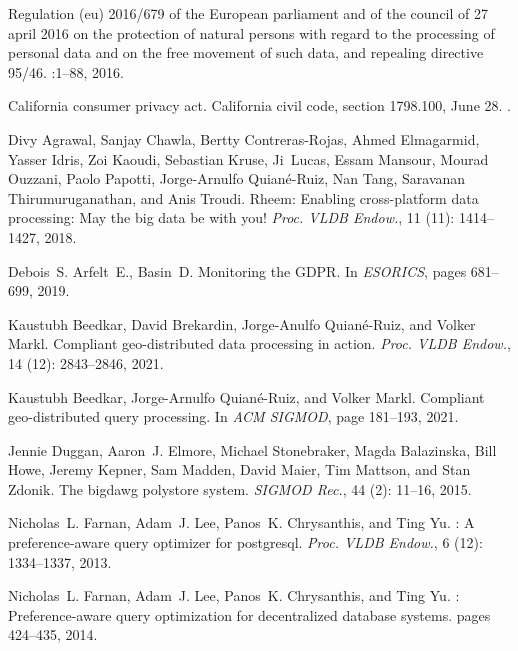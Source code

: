 \documentclass[11pt]{article}
\begin{document}
\begin{thebibliography}{10}
\itemsep=1pt
\begin{small}


Regulation (eu) 2016/679 of the European parliament and of the council of 27
  april 2016 on the protection of natural persons with regard to the processing
  of personal data and on the free movement of such data, and repealing
  directive 95/46. :1--88, 2016.


California consumer privacy act. California civil code, section 1798.100, June 28. 
.



Divy Agrawal, Sanjay Chawla, Bertty Contreras-Rojas, Ahmed Elmagarmid, Yasser
  Idris, Zoi Kaoudi, Sebastian Kruse, Ji~Lucas, Essam Mansour, Mourad Ouzzani,
  Paolo Papotti, Jorge-Arnulfo Quian\'{e}-Ruiz, Nan Tang, Saravanan
  Thirumuruganathan, and Anis Troudi.
\newblock Rheem: Enabling cross-platform data processing: May the big data be
  with you!
\newblock \emph{Proc. VLDB Endow.}, 11 (11): 1414–1427,
  2018.

Debois~S. Arfelt~E., Basin~D.
\newblock Monitoring the {GDPR}.
\newblock In \emph{ESORICS}, pages 681--699, 2019.

Kaustubh Beedkar, David Brekardin, Jorge-Anulfo Quian\'{e}-Ruiz, and Volker
  Markl.
\newblock Compliant geo-distributed data processing in action.
\newblock \emph{Proc. VLDB Endow.}, 14 (12): 2843–2846,
  2021.

Kaustubh Beedkar, Jorge-Arnulfo Quian\'{e}-Ruiz, and Volker Markl.
\newblock Compliant geo-distributed query processing.
\newblock In \emph{ACM SIGMOD}, page 181–193, 2021.

Jennie Duggan, Aaron~J. Elmore, Michael Stonebraker, Magda Balazinska, Bill
  Howe, Jeremy Kepner, Sam Madden, David Maier, Tim Mattson, and Stan Zdonik.
\newblock The bigdawg polystore system.
\newblock \emph{SIGMOD Rec.}, 44 (2): 11–16, 2015.

Nicholas~L. Farnan, Adam~J. Lee, Panos~K. Chrysanthis, and Ting Yu.
: A preference-aware query optimizer for postgresql.
\newblock \emph{Proc. VLDB Endow.}, 6 (12): 1334–1337,
  2013.

Nicholas~L. Farnan, Adam~J. Lee, Panos~K. Chrysanthis, and Ting Yu.
: Preference-aware query optimization for decentralized
  database systems.
\newblock pages 424--435, 2014.


\end{small}
\end{thebibliography}
\end{document}
